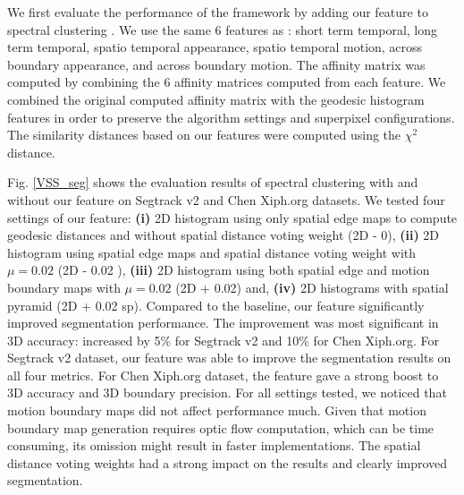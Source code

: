 \documentclass[runningheads]{llncs}
\begin{document}
We first evaluate the performance of the framework by adding our feature to spectral clustering  \cite{Galasso2013}. We use the same 6 features as  \cite{Galasso2013}: short term temporal, long term temporal, spatio temporal appearance, spatio temporal motion, across boundary appearance, and across boundary motion. The affinity matrix was computed by combining the 6 affinity matrices computed from each feature. We combined the original computed affinity matrix  with the geodesic histogram features in order to preserve the algorithm settings and superpixel configurations. The similarity distances based on our features were computed using the $\chi^2$ distance.

Fig. \ref{VSS_seg} shows the evaluation results of spectral clustering with and without our feature on Segtrack v2 and Chen Xiph.org datasets. We tested four settings of our feature: \textbf{(i)} 2D histogram using only spatial edge maps to compute geodesic distances and without spatial distance voting weight (2D - 0), \textbf{(ii)} 2D histogram using spatial edge maps and spatial distance voting weight with $\mu = 0.02$ (2D - 0.02 ), \textbf{(iii)} 2D histogram using both spatial edge and motion boundary maps with $\mu = 0.02$ (2D + 0.02) and, \textbf{(iv)} 2D histograms with spatial pyramid (2D + 0.02 sp). Compared to the baseline, our feature significantly improved  segmentation performance. The improvement was most significant in 3D accuracy: increased by 5\% for Segtrack v2 and 10\% for Chen Xiph.org. For Segtrack v2 dataset, our feature was able to improve the segmentation results on all four metrics. For Chen Xiph.org dataset, the feature gave a strong boost to 3D accuracy and 3D boundary precision. For all settings tested, we noticed that motion boundary maps did not affect performance much. Given that motion boundary map generation requires optic flow computation, which can be time consuming, its omission might result in faster implementations. The spatial distance voting weights had a strong impact on the results and clearly improved segmentation.
\end{document}
